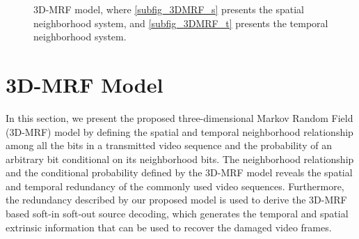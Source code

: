 \documentclass[10pt,twocolumn,twoside]{IEEEtran}
\begin{document}
\begin{figure}[!t]
	\caption{3D-MRF model, where \ref{subfig_3DMRF_s} presents the spatial neighborhood system, and \ref{subfig_3DMRF_t} presents the temporal neighborhood system.}
\label{fig_3DMRF}
\end{figure}

\section{3D-MRF Model}\label{sec_3dmrf}

In this section, we present the proposed three-dimensional Markov Random Field (3D-MRF) model by defining the spatial and temporal neighborhood relationship among all the bits in a transmitted video sequence and the probability of an arbitrary bit conditional on its neighborhood bits. The neighborhood relationship and the conditional probability defined by the 3D-MRF model reveals the spatial and temporal redundancy of the commonly used video sequences. Furthermore, the redundancy described by our proposed model is used to derive the 3D-MRF based soft-in soft-out source decoding, which generates the temporal and spatial extrinsic information that can be used to recover the damaged video frames.
\end{document}
